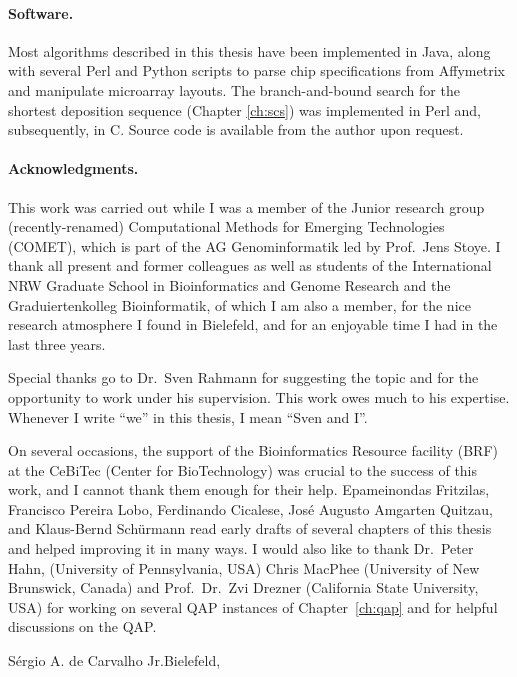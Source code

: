 \paragraph{Software.}
Most algorithms described in this thesis have been implemented in Java, along
with several Perl and Python scripts to parse chip specifications from
Affymetrix and manipulate microarray layouts. The branch-and-bound search for
the shortest deposition sequence (Chapter \ref{ch:scs}) was implemented in Perl
and, subsequently, in C. Source code is available from the author upon request.

\paragraph{Acknowledgments.}
This work was carried out while I was a member of the Junior research group
(recently-renamed) Computational Methods for Emerging Technologies (COMET), which
is part of the AG Genominformatik led by Prof.~Jens Stoye. I thank all present
and former colleagues as well as students of the International NRW Graduate
School in Bioinformatics and Genome Research and the Graduiertenkolleg
Bioinformatik, of which I am also a member, for the nice research atmosphere I
found in Bielefeld, and for an enjoyable time I had in the last three years.

Special thanks go to Dr.~Sven Rahmann for suggesting the topic and for the
opportunity to work under his supervision. This work owes much to his expertise.
Whenever I write ``we'' in this thesis, I mean ``Sven and I''.

On several occasions, the support of the Bioinformatics Resource facility (BRF)
at the CeBiTec (Center for BioTechnology) was crucial to the success of this
work, and I cannot thank them enough for their help. Epameinondas Fritzilas,
Francisco Pereira Lobo, Ferdinando Cicalese, Jos\'e Augusto Amgarten Quitzau,
and Klaus-Bernd Sch\"urmann read early drafts of several chapters of this thesis
and helped improving it in many ways. I would also like to thank Dr.~Peter
Hahn, (University of Pennsylvania, USA) Chris MacPhee (University of New
Brunswick, Canada) and Prof.~Dr.~Zvi Drezner (California State University, USA)
for working on several QAP instances of Chapter~\ref{ch:qap} and for helpful
discussions on the QAP.

\vspace*{6ex}
S\'ergio A. de Carvalho Jr.\hfill Bielefeld, \handinmonth
